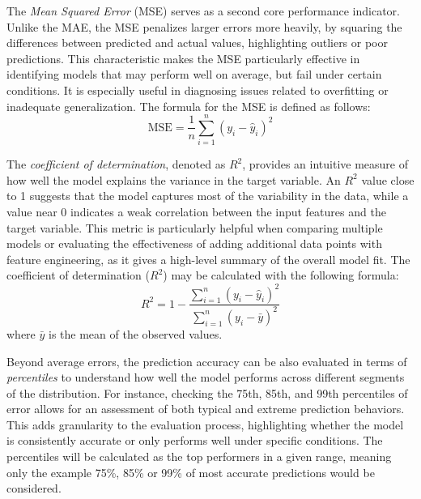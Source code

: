 \documentclass[12pt]{report} %
\begin{document}
The \textit{Mean Squared Error} (MSE) serves as a second core performance indicator. Unlike the MAE, the MSE penalizes larger errors more heavily, by squaring the differences between predicted and actual values, highlighting outliers or poor predictions. This characteristic makes the MSE particularly effective in identifying models that may perform well on average, but fail under certain conditions. It is especially useful in diagnosing issues related to overfitting or inadequate generalization. The formula for the MSE is defined as follows:
\[
\text{MSE} = \frac{1}{n} \sum_{i=1}^{n} \left( y_i - \hat{y}_i \right)^2
\]

The \textit{coefficient of determination}, denoted as $R^2$, provides an intuitive measure of how well the model explains the variance in the target variable. An $R^2$ value close to 1 suggests that the model captures most of the variability in the data, while a value near 0 indicates a weak correlation between the input features and the target variable. This metric is particularly helpful when comparing multiple models or evaluating the effectiveness of adding additional data points with feature engineering, as it gives a high-level summary of the overall model fit. The coefficient of determination (\( R^2 \)) may be calculated with the following formula:
\[
R^2 = 1 - \frac{\sum_{i=1}^{n} \left( y_i - \hat{y}_i \right)^2}{\sum_{i=1}^{n} \left( y_i - \bar{y} \right)^2}
\]
where \( \bar{y} \) is the mean of the observed values.

Beyond average errors, the prediction accuracy can be also evaluated in terms of \textit{percentiles} to understand how well the model performs across different segments of the distribution. For instance, checking the 75th, 85th, and 99th percentiles of error allows for an assessment of both typical and extreme prediction behaviors. This adds granularity to the evaluation process, highlighting whether the model is consistently accurate or only performs well under specific conditions. The percentiles will be calculated as the top performers in a given range, meaning only the example 75\%, 85\% or 99\% of most accurate predictions would be considered.
\end{document}
